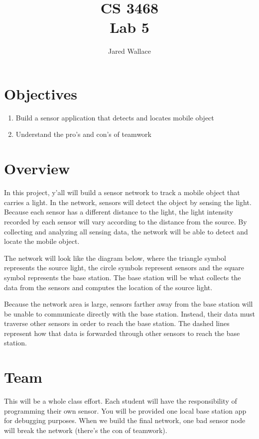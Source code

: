 \documentclass[letterpaper,12pt]{article}
\title{\Large CS 3468\\Lab 5}
\author{Jared Wallace}
\date{}
\begin{document}
\maketitle

\vspace{30mm}

\section*{Objectives}
\begin{enumerate}
\item Build a sensor application that detects and locates mobile object
\item Understand the pro's and con's of teamwork
\end{enumerate}

\section*{Overview}
In this project, y'all will build a sensor network to track a mobile object
that carries a light. In the network, sensors will detect the object by sensing
the light. Because each sensor has a different distance to the light, the light
intensity recorded by each sensor will vary according to the distance from the source.
By collecting and analyzing all sensing data, the network will be able to detect and
locate the mobile object.

The network will look like the diagram below, where the triangle symbol represents the source
light, the circle symbols represent sensors and the square symbol represents the base station.
The base station will be what collects the data from the sensors and computes the location of
the source light.

Because the network area is large, sensors farther away from the base station will be unable to
communicate directly with the base station. Instead, their data must traverse other sensors in
order to reach the base station. The dashed lines represent how that data is forwarded through
other sensors to reach the base station.

\section*{Team}
This will be a whole class effort. Each student will have the responsibility of programming their
own sensor. You will be provided one local base station app for debugging purposes. When we build
the final network, one bad sensor node will break the network (there's the con of teamwork).
\end{document}
